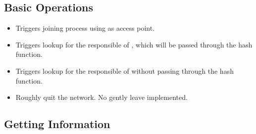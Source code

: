 \documentclass[11pt]{article}
\begin{document}
\subsection{Basic Operations}

\begin{itemize}

	\item {} Triggers joining process using 
as access point.

	\item {} Triggers lookup for the responsible of
, which will be passed through the hash function.

	\item {} Triggers lookup for the responsible of
 without passing  through the hash function.

	\item {} Roughly quit the network. No gently leave implemented.
 
\end{itemize}

\subsection{Getting Information}
\end{document}
